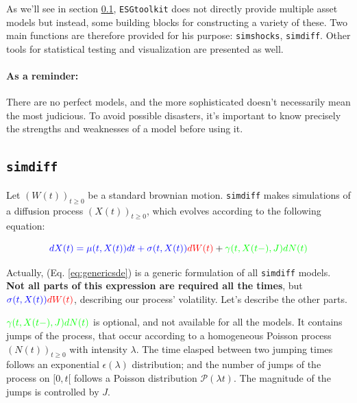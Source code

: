 \documentclass[a4paper]{article}\usepackage[]{graphicx}\usepackage[]{color}
\newcommand{\code}[1]{\mbox{\texttt{#1}}}
\begin{document}
\medskip

As we'll see in section \ref{sec:simdiff}, \code{ESGtoolkit} does not directly provide multiple asset models but instead, some building blocks for constructing a variety of these. Two main functions are therefore provided for his purpose: \code{simshocks}, \code{simdiff}. Other tools for statistical testing and visualization are presented as well.

\paragraph{As a reminder:}
\label{para}
There are no perfect models, and the more sophisticated doesn't necessarily mean the most judicious. To avoid possible disasters, it's important to know precisely the strengths and weaknesses of a model before using it.

\subsection{\code{simdiff}}
\label{sec:simdiff}

Let $(W(t))_{t \geq 0}$ be a standard brownian motion. \code{simdiff} makes simulations of a  diffusion process $(X(t))_{t \geq 0}$, which evolves according to the following equation: 

\begin{equation}
\label{eq:genericsde}
\textcolor{blue}{dX(t) = \mu(t, X(t)) dt + \sigma(t, X(t))} \textcolor{red}{dW(t)} + \textcolor{green}{\gamma(t, X(t-), J)dN(t)}
\end{equation}

\medskip

Actually, (Eq. \ref{eq:genericsde}) is a generic formulation of all \code{simdiff} models. {\bf Not all parts of this expression are required all the times}, but $\textcolor{blue}{\sigma(t, X(t))} \textcolor{red}{dW(t)}$, describing our process' volatility. Let's describe the other parts. 

\medskip

$\textcolor{green}{\gamma(t, X(t-), J) dN(t)}$ is optional, and not available for all the models. It contains jumps of the process, that occur according to a homogeneous Poisson process $(N(t))_{t \geq 0}$ with  intensity $\lambda$. The time elasped between two jumping times follows an exponential $\epsilon(\lambda)$ distribution; and the number of jumps of the process on $[0, t[$ follows a Poisson distribution $\mathcal{P}(\lambda t)$. The magnitude of the jumps is controlled by $J$.    
\end{document}
